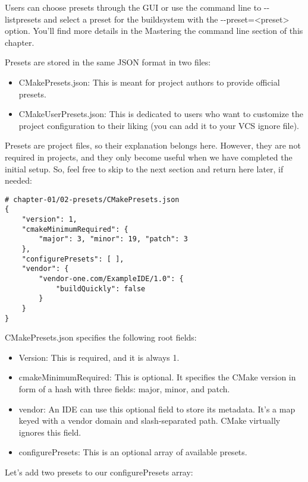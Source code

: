Users can choose presets through the GUI or use the command line to -{}-listpresets and select a preset for the buildsystem with the -{}-preset=<preset> option. You'll find more details in the Mastering the command line section of this chapter.

Presets are stored in the same JSON format in two files:

\begin{itemize}
\item 
CMakePresets.json: This is meant for project authors to provide official presets.

\item 
CMakeUserPresets.json: This is dedicated to users who want to customize the
project configuration to their liking (you can add it to your VCS ignore file).
\end{itemize}

Presets are project files, so their explanation belongs here. However, they are not required in projects, and they only become useful when we have completed the initial setup. So, feel free to skip to the next section and return here later, if needed:

\begin{lstlisting}[style=styleCMake]
# chapter-01/02-presets/CMakePresets.json
{
	"version": 1,
	"cmakeMinimumRequired": {
		"major": 3, "minor": 19, "patch": 3
	},
	"configurePresets": [ ],
	"vendor": {
		"vendor-one.com/ExampleIDE/1.0": {
			"buildQuickly": false
		}
	}
}
\end{lstlisting}

CMakePresets.json specifies the following root fields:

\begin{itemize}
\item 
Version: This is required, and it is always 1.

\item 
cmakeMinimumRequired: This is optional. It specifies the CMake version in form of a hash with three fields: major, minor, and patch.

\item 
vendor: An IDE can use this optional field to store its metadata. It's a map keyed with a vendor domain and slash-separated path. CMake virtually ignores this field.

\item 
configurePresets: This is an optional array of available presets.
\end{itemize}

Let's add two presets to our configurePresets array:

